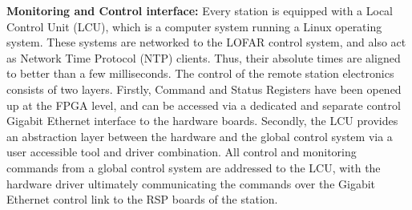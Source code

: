 \documentclass{ws-jai}
\begin{document}

\noindent \textbf {Monitoring and Control  interface:} Every station is equipped
with a  Local Control  Unit (LCU), which  is a computer  system running  a Linux
operating system.  These systems are networked  to the LOFAR control system, and
also act as Network Time Protocol  (NTP) clients. Thus, their absolute times are
aligned to  better than a  few milliseconds. The  control of the  remote station
electronics consists of  two layers. Firstly, Command and  Status Registers have
been  opened up  at the  FPGA level,  and can  be accessed  via a  dedicated and
separate control  Gigabit Ethernet interface  to the hardware  boards. Secondly,
the  LCU provides  an  abstraction layer  between the  hardware  and the  global
control system  via a user accessible  tool and driver combination.  All control
and monitoring commands  from a global control system are  addressed to the LCU,
with the hardware driver ultimately  communicating the commands over the Gigabit
Ethernet control link to the RSP boards of the station.


\end{document}
